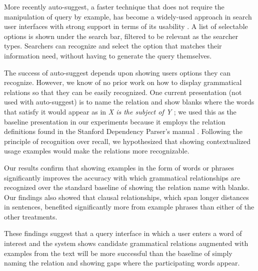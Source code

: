 More recently auto-suggest, a faster technique that does not require the manipulation of query by example, has become a widely-used approach in search user interfaces with strong support in terms of its usability \cite{anick2008longitudinal,ward2012autocomplete,jagadish2007making}. A list of selectable options is shown under the search bar, filtered to be relevant as the searcher types. Searchers can recognize and select the option that matches their information need, without having to generate the query themselves.

The success of auto-suggest depends upon showing users options they can recognize. However, we know of no prior work on how to display grammatical relations so that they can be easily recognized. One current presentation (not used with auto-suggest) is to name the relation and show blanks where the words that satisfy it would appear as in \emph{X is the subject of Y} \cite{muralidharan2013supporting}; we used this as the baseline presentation in our experiments because it employs the relation definitions found in the Stanford Dependency Parser's manual \cite{de2006generating}. Following the principle of recognition over recall, we hypothesized that showing contextualized usage examples would make the relations more recognizable.

Our results confirm that showing examples in the form of words or phrases significantly improves the accuracy with which grammatical relationships are recognized over the standard baseline of showing the relation name with blanks. Our findings also showed that clausal relationships, which span longer distances in sentences, benefited significantly more from example phrases than either of the other treatments.

These findings suggest that a query interface in which a user enters a word of interest and the system shows candidate grammatical relations augmented with examples from the text will be more successful than the baseline of simply naming the relation and showing gaps where the participating words appear.
